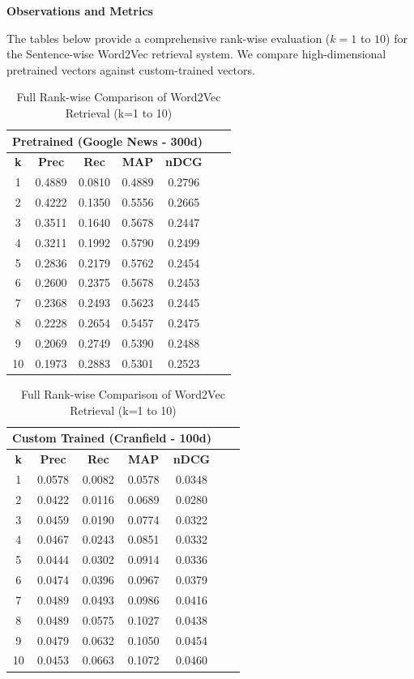 \documentclass{article}
\begin{document}
\textbf{Observations and Metrics}

The tables below provide a comprehensive rank-wise evaluation ($k=1$ to $10$) for the Sentence-wise Word2Vec retrieval system. We compare high-dimensional pretrained vectors against custom-trained vectors.

\begin{table}[H]
\centering
\small
\begin{minipage}{0.48\textwidth}
\centering
\begin{tabular}{|c|ccc|ccc|}
\hline
\multicolumn{5}{|c|}{\textbf{Pretrained (Google News - 300d)}} \\ \hline
\textbf{k} & \textbf{Prec} & \textbf{Rec} & \textbf{MAP} & \textbf{nDCG} \\ \hline
1  & 0.4889 & 0.0810 & 0.4889 & 0.2796 \\
2  & 0.4222 & 0.1350 & 0.5556 & 0.2665 \\
3  & 0.3511 & 0.1640 & 0.5678 & 0.2447 \\
4  & 0.3211 & 0.1992 & 0.5790 & 0.2499 \\
5  & 0.2836 & 0.2179 & 0.5762 & 0.2454 \\
6  & 0.2600 & 0.2375 & 0.5678 & 0.2453 \\
7  & 0.2368 & 0.2493 & 0.5623 & 0.2445 \\
8  & 0.2228 & 0.2654 & 0.5457 & 0.2475 \\
9  & 0.2069 & 0.2749 & 0.5390 & 0.2488 \\
10 & 0.1973 & 0.2883 & 0.5301 & 0.2523 \\ \hline
\end{tabular}
\end{minipage}
\hfill
\begin{minipage}{0.48\textwidth}
\centering
\begin{tabular}{|c|ccc|ccc|}
\hline
\multicolumn{5}{|c|}{\textbf{Custom Trained (Cranfield - 100d)}} \\ \hline
\textbf{k} & \textbf{Prec} & \textbf{Rec} & \textbf{MAP} & \textbf{nDCG} \\ \hline
1  & 0.0578 & 0.0082 & 0.0578 & 0.0348 \\
2  & 0.0422 & 0.0116 & 0.0689 & 0.0280 \\
3  & 0.0459 & 0.0190 & 0.0774 & 0.0322 \\
4  & 0.0467 & 0.0243 & 0.0851 & 0.0332 \\
5  & 0.0444 & 0.0302 & 0.0914 & 0.0336 \\
6  & 0.0474 & 0.0396 & 0.0967 & 0.0379 \\
7  & 0.0489 & 0.0493 & 0.0986 & 0.0416 \\
8  & 0.0489 & 0.0575 & 0.1027 & 0.0438 \\
9  & 0.0479 & 0.0632 & 0.1050 & 0.0454 \\
10 & 0.0453 & 0.0663 & 0.1072 & 0.0460 \\ \hline
\end{tabular}
\end{minipage}
\caption{Full Rank-wise Comparison of Word2Vec Retrieval (k=1 to 10)}
\end{table}
\end{document}
